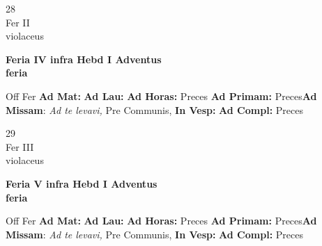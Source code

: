 \documentclass[10pt, openany]{book}
\begin{document}
    \begin{center}
        \begin{minipage}{3.5in}
            \vspace{2em}
            \begin{minipage}{0.5in}
                {\Huge 28} \\
                {\normalsize Fer II} \\
                {\normalsize violaceus}
            \end{minipage}
            \begin{minipage}{3.0in}
                \textbf{ \large Feria IV infra Hebd I Adventus \\
                \textnormal{\normalsize feria}} \\ 
            \end{minipage}
            \begin{justify}Off Fer
                \textbf{Ad Mat: }
                \textbf{Ad Lau: }
                \textbf{Ad Horas: }Preces
                \textbf{Ad Primam: }Preces\textbf{Ad Missam}: \textit{Ad te levavi,} Pre Communis,  
                \textbf{In Vesp: }
                \textbf{Ad Compl: }Preces
            \end{justify}
        \end{minipage}
    \end{center}

    \begin{center}
        \begin{minipage}{3.5in}
            \vspace{2em}
            \begin{minipage}{0.5in}
                {\Huge 29} \\
                {\normalsize Fer III} \\
                {\normalsize violaceus}
            \end{minipage}
            \begin{minipage}{3.0in}
                \textbf{ \large Feria V infra Hebd I Adventus \\
                \textnormal{\normalsize feria}} \\ 
            \end{minipage}
            \begin{justify}Off Fer
                \textbf{Ad Mat: }
                \textbf{Ad Lau: }
                \textbf{Ad Horas: }Preces
                \textbf{Ad Primam: }Preces\textbf{Ad Missam}: \textit{Ad te levavi,} Pre Communis,  
                \textbf{In Vesp: }
                \textbf{Ad Compl: }Preces
            \end{justify}
        \end{minipage}
    \end{center}
\end{document}
